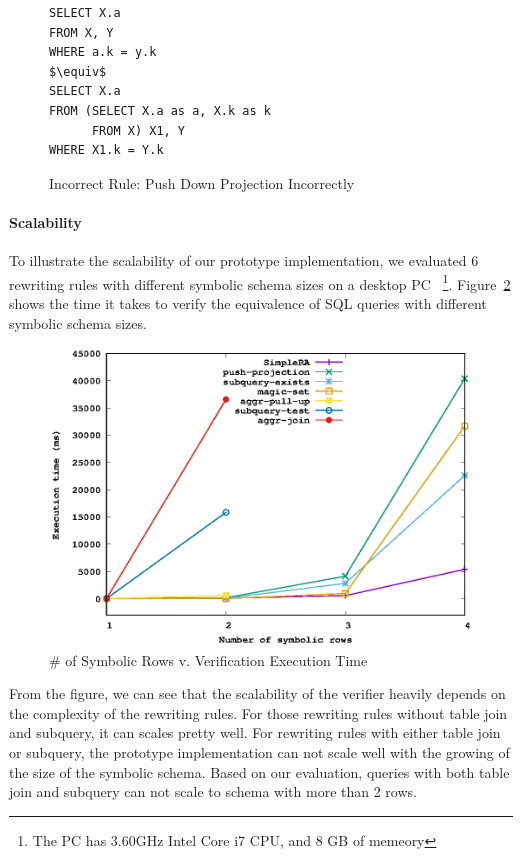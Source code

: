 \begin{figure}[!htb]
\begin{lstlisting}[style=sql,xleftmargin=.3\textwidth,mathescape=true]
SELECT X.a
FROM X, Y
WHERE a.k = y.k
$\equiv$
SELECT X.a
FROM (SELECT X.a as a, X.k as k
      FROM X) X1, Y
WHERE X1.k = Y.k
\end{lstlisting}
\caption{Incorrect Rule: Push Down Projection Incorrectly}
\label{fig:push-proj}
\end{figure}

\paragraph{Scalability}
To illustrate the scalability of our prototype implementation, we evaluated
6 rewriting rules with different symbolic schema sizes on a desktop PC
~\footnote{The PC has 3.60GHz Intel Core i7 CPU, and 8 GB of memeory}.
Figure~\ref{fig:scale} shows the time it takes to verify the equivalence of SQL queries
with different symbolic schema sizes.

\begin{figure}[!htb]
  \centering
  \includegraphics[width=0.7\linewidth]{scale.eps}
  \caption{\# of Symbolic Rows v. Verification Execution Time}
  \label{fig:scale}
\end{figure}

From the figure, we can see that the scalability of the verifier heavily depends 
on the complexity of the rewriting rules.
For those rewriting rules without table join and subquery, it can scales pretty well.
For rewriting rules with either table join or subquery, the prototype implementation can 
not scale well with the growing of the size of the symbolic schema.
Based on our evaluation, queries with both table join and subquery can not scale to schema with
more than 2 rows.

